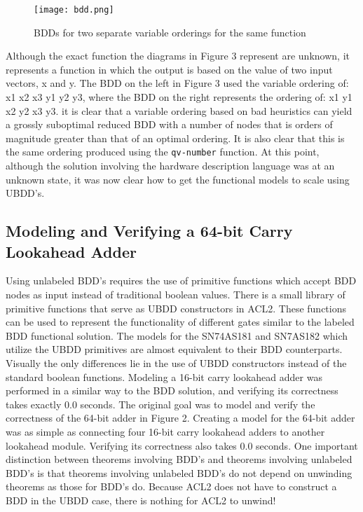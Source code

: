 \documentclass[fleqn,10pt]{SelfArx} %
\begin{document}
\begin{figure}[ht!]
\caption{BDDs for two separate variable orderings for the same function}
{
\setlength{\fboxsep}{0pt}
\setlength{\fboxrule}{1pt}
\texttt{[image: bdd.png]}
}
\end{figure}

Although the exact function the diagrams in Figure 3 represent are unknown, it represents a function in which the output is based on the value of two input vectors, x and y. The BDD on the left in Figure 3 used the variable ordering of: x1 x2 x3 y1 y2 y3, where the BDD on the right represents the ordering of: x1 y1 x2 y2 x3 y3. it is clear that a variable ordering based on bad heuristics can yield a grossly suboptimal reduced BDD with a number of nodes that is orders of magnitude greater than that of an optimal ordering. It is also clear that this is the same ordering produced using the \lstinline{qv-number} function. At this point, although the solution involving the hardware description language was at an unknown state, it was now clear how to get the functional models to scale using UBDD's.

\subsection{Modeling and Verifying a 64-bit Carry Lookahead Adder}

Using unlabeled BDD's requires the use of primitive functions which accept BDD nodes as input instead of traditional boolean values. There is a small library of primitive functions that serve as UBDD constructors in ACL2. These functions can be used to represent the functionality of different gates similar to the labeled BDD functional solution. The models for the SN74AS181 and SN7AS182 which utilize the UBDD primitives are almost equivalent to their BDD counterparts. Visually the only differences lie in the use of UBDD constructors instead of the standard boolean functions. Modeling a 16-bit carry lookahead adder was performed in a similar way to the BDD solution, and verifying its correctness takes exactly 0.0 seconds. The original goal was to model and verify the correctness of the 64-bit adder in Figure 2. Creating a model for the 64-bit adder was as simple as connecting four 16-bit carry lookahead adders to another lookahead module. Verifying its correctness also takes 0.0 seconds. One important distinction between theorems involving BDD's and theorems involving unlabeled BDD's is that theorems involving unlabeled BDD's do not depend on unwinding theorems as those for BDD's do. Because ACL2 does not have to construct a BDD in the UBDD case, there is nothing for ACL2 to unwind!
\end{document}

